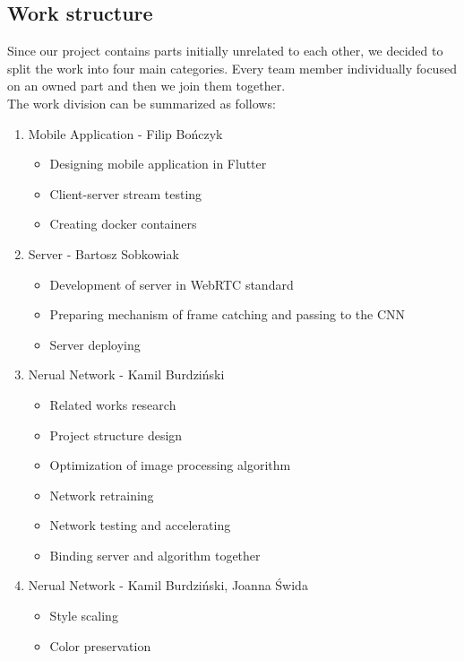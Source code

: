 \documentclass[../Main.tex]{subfiles}
\begin{document}
\subsection{Work structure}
Since our project contains parts initially unrelated to each other, we decided to split the work into four main categories. Every team member individually focused on an owned part and then we join them together. \\
The work division can be summarized as follows:
\begin{enumerate}
    \item Mobile Application - Filip Bończyk
        \begin{itemize}
            \item Designing mobile application in Flutter
            \item Client-server stream testing 
            \item Creating docker containers
        \end{itemize}
    \item Server - Bartosz Sobkowiak
        \begin{itemize}
            \item Development of server in WebRTC standard
            \item Preparing mechanism of frame catching and passing to the CNN
            \item Server deploying
        \end{itemize}
    \item Nerual Network - Kamil Burdziński
        \begin{itemize}
            \item Related works research
            \item Project structure design
            \item Optimization of image processing algorithm
            \item Network retraining
            \item Network testing and accelerating
            \item Binding server and algorithm together
        \end{itemize}
         \item Nerual Network - Kamil Burdziński, Joanna Świda
        \begin{itemize}
            \item Style scaling
            \item Color preservation
        \end{itemize}
\end{enumerate}
\end{document}
